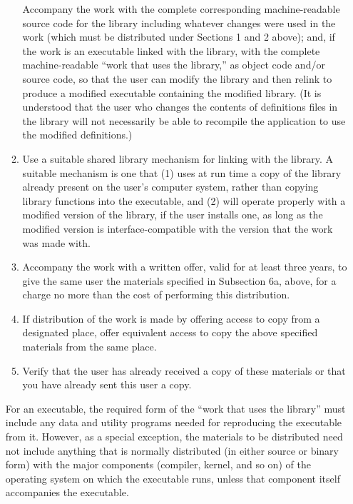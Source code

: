 \documentclass[11pt, letterpaper]{book}
\begin{document}
\begin{enumerate}
\begin{enumerate}
    Accompany the work with the complete corresponding machine-readable
    source code for the library including whatever changes were used in
    the work (which must be distributed under Sections 1 and 2 above);
    and, if the work is an executable linked with the library, with the
    complete machine-readable ``work that uses the library,'' as object
    code and/or source code, so that the user can modify the library and
    then relink to produce a modified executable containing the modified
    library. (It is understood that the user who changes the contents of
    definitions files in the library will not necessarily be able to
    recompile the application to use the modified definitions.)

  \item

    Use a suitable shared library mechanism for linking with the library.
    A suitable mechanism is one that (1) uses at run time a copy of the
    library already present on the user's computer system, rather than
    copying library functions into the executable, and (2) will operate
    properly with a modified version of the library, if the user installs
    one, as long as the modified version is interface-compatible with the
    version that the work was made with.

  \item

    Accompany the work with a written offer, valid for at least three
    years, to give the same user the materials specified in Subsection 6a,
    above, for a charge no more than the cost of performing this
    distribution.

  \item

    If distribution of the work is made by offering access to copy from a
    designated place, offer equivalent access to copy the above specified
    materials from the same place.

  \item

    Verify that the user has already received a copy of these materials or
    that you have already sent this user a copy.
\end{enumerate}

For an executable, the required form of the ``work that uses the library''
must include any data and utility programs needed for reproducing the
executable from it. However, as a special exception, the materials to be
distributed need not include anything that is normally distributed (in
either source or binary form) with the major components (compiler, kernel,
and so on) of the operating system on which the executable runs, unless
that component itself accompanies the executable.


\end{enumerate}
\end{document}
